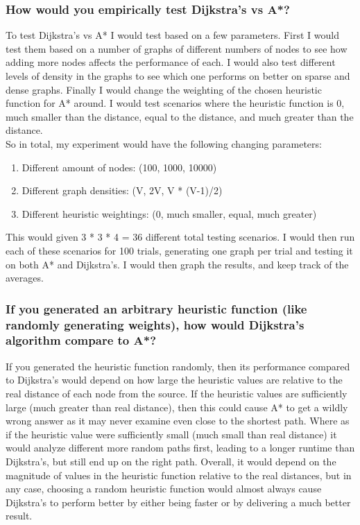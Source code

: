 \documentclass[12pt]{article}
\begin{document}
\subsubsection*{How would you empirically test Dijkstra’s vs A*?}
To test Dijkstra's vs A* I would test based on a few parameters. First I would test them based on a number of
graphs of different numbers of nodes to see how adding more nodes affects the performance of each. I would also
test different levels of density in the graphs to see which one performs on better on sparse and dense graphs.
Finally I would change the weighting of the chosen heuristic function for A* around. I would test scenarios where
the heuristic function is 0, much smaller than the distance, equal to the distance, and much greater than the distance. \\
So in total, my experiment would have the following changing parameters:
\begin{enumerate}
    \item Different amount of nodes: (100, 1000, 10000)
    \item Different graph densities: (V, 2V, V * (V-1)/2)
    \item Different heuristic weightings: (0, much smaller, equal, much greater)
\end{enumerate}
This would given 3 * 3 * 4 = 36 different total testing scenarios. I would then run each of these scenarios for 100 trials,
generating one graph per trial and testing it on both A* and Dijkstra's. I would then graph the results, and keep track of 
the averages.

\subsubsection*{If you generated an arbitrary heuristic function (like randomly generating weights), how
would Dijkstra’s algorithm compare to A*?}
If you generated the heuristic function randomly, then its performance compared to Dijkstra's would depend on how large the heuristic
values are relative to the real distance of each node from the source. If the heuristic values are sufficiently large 
(much greater than real distance), then this could cause A* to get a wildly wrong answer as it may never examine even close to the 
shortest path. Where as if the heuristic value were sufficiently small (much small than real distance) it would analyze different more
random paths first, leading to a longer runtime than Dijkstra’s, but still end up on the right path. Overall, it would depend on the
magnitude of values in the heuristic function relative to the real distances, but in any case, choosing a random heuristic function
would almost always cause Dijkstra's to perform better by either being faster or by delivering a much better result.
\end{document}
